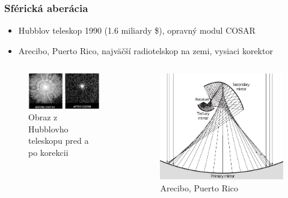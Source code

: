 \documentclass[10pt,xcolor=pdflatex]{beamer}
\begin{document}
\begin{frame}\frametitle{Sférická aberácia}
    \begin{itemize}
        \item Hubblov teleskop 1990 (1.6 miliardy \$), opravný modul COSAR 
        \item Arecibo, Puerto Rico, najväčší radiotelskop na zemi, vysiaci korektor 
    \end{itemize}

    \begin{columns}
    \begin{figure}
        \includegraphics[scale=0.5]{img/cosar.png}
        \caption{Obraz z Hubblovho teleskopu pred a po korekcii}
    \end{figure}
    \begin{figure}
        \includegraphics[scale=0.5]{img/arecibo.pdf}
        \caption{Arecibo, Puerto Rico}
    \end{figure}
    \end{columns}
\end{frame}
\end{document}
